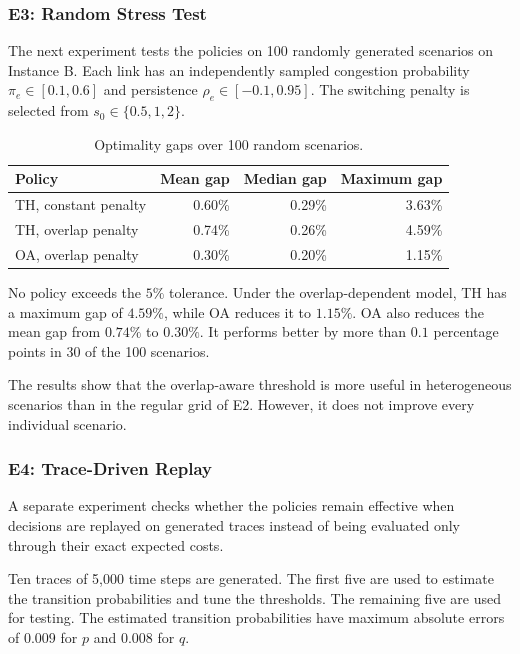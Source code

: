 \documentclass{amsart}
\begin{document}
\subsubsection{E3: Random Stress Test}

The next experiment tests the policies on 100 randomly generated
scenarios on Instance B. Each link has an independently sampled
congestion probability $\pi_e\in[0.1,0.6]$ and persistence
$\rho_e\in[-0.1,0.95]$. The switching penalty is selected from
$s_0\in\{0.5,1,2\}$.

\begin{table}[ht]
\centering
\begin{tabular}{lrrr}
\hline
Policy & Mean gap & Median gap & Maximum gap \\
\hline
TH, constant penalty & 0.60\% & 0.29\% & 3.63\% \\
TH, overlap penalty & 0.74\% & 0.26\% & 4.59\% \\
OA, overlap penalty & 0.30\% & 0.20\% & 1.15\% \\
\hline
\end{tabular}
\caption{Optimality gaps over 100 random scenarios.}
\label{tab:e3}
\end{table}

No policy exceeds the $5\%$ tolerance. Under the overlap-dependent
model, TH has a maximum gap of $4.59\%$, while OA reduces it to
$1.15\%$. OA also reduces the mean gap from $0.74\%$ to $0.30\%$.
It performs better by more than $0.1$ percentage points in
30 of the 100 scenarios.

The results show that the overlap-aware threshold is more useful
in heterogeneous scenarios than in the regular grid of E2.
However, it does not improve every individual scenario.

\subsubsection{E4: Trace-Driven Replay}

A separate experiment checks whether the policies remain effective
when decisions are replayed on generated traces instead of being
evaluated only through their exact expected costs.

Ten traces of 5,000 time steps are generated. The first five are
used to estimate the transition probabilities and tune the
thresholds. The remaining five are used for testing. The estimated
transition probabilities have maximum absolute errors of
$0.009$ for $p$ and $0.008$ for $q$.
\end{document}
